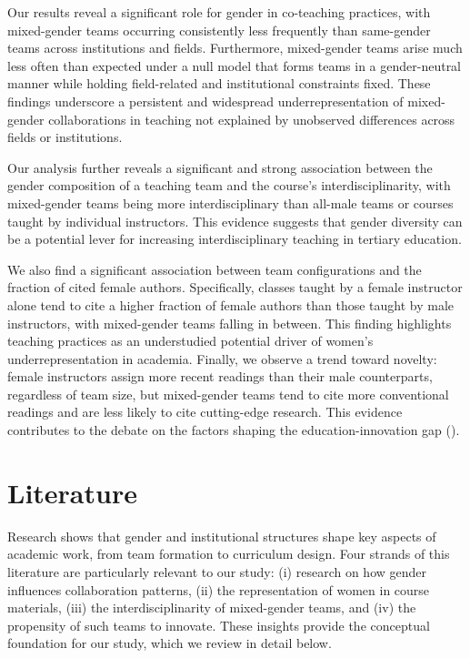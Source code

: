 \documentclass[
  british,
  12pt, %
]{article}
\begin{document}
Our results reveal a significant role for gender in co-teaching practices, with mixed-gender teams occurring consistently less frequently than same-gender teams across institutions and fields. Furthermore, mixed-gender teams arise much less often than expected under a null model that forms teams in a gender-neutral manner while holding field-related and institutional constraints fixed. These findings underscore a persistent and widespread underrepresentation of mixed-gender collaborations in teaching not explained by unobserved differences across fields or institutions.

Our analysis further reveals a significant and strong association between the gender composition of a teaching team and the course's interdisciplinarity, with mixed-gender teams being more interdisciplinary than all-male teams or courses taught by individual instructors. This evidence suggests that gender diversity can be a potential lever for increasing interdisciplinary teaching in tertiary education.

We also find a significant association between team configurations and the fraction of cited female authors. Specifically, classes taught by a female instructor alone tend to cite a higher fraction of female authors than those taught by male instructors, with mixed-gender teams falling in between. This finding highlights teaching practices as an understudied potential driver of women's underrepresentation in academia. Finally, we observe a trend toward novelty: female instructors assign more recent readings than their male counterparts, regardless of team size, but mixed-gender teams tend to cite more conventional readings and are less likely to cite cutting-edge research. This evidence contributes to the debate on the factors shaping the education-innovation gap ().

\section{Literature}\label{literature}

Research shows that gender and institutional structures shape key aspects of academic work, from team formation to curriculum design. Four strands of this literature are particularly relevant to our study: (i) research on how gender influences collaboration patterns, (ii) the representation of women in course materials, (iii) the interdisciplinarity of mixed-gender teams, and (iv) the propensity of such teams to innovate. These insights provide the conceptual foundation for our study, which we review in detail below.
\end{document}
